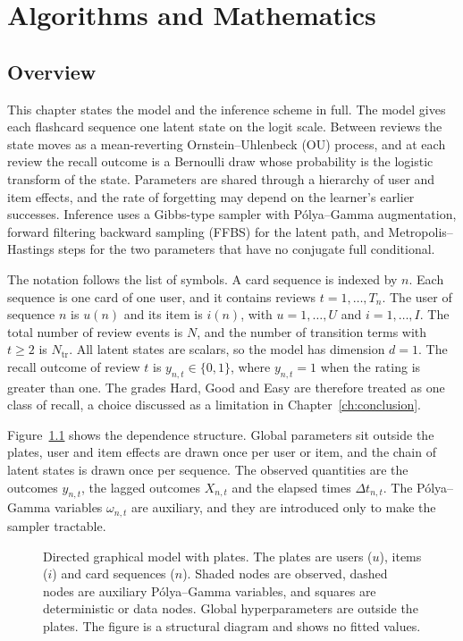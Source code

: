 \chapter{Algorithms and Mathematics}
\label{ch:methodology}

\section{Overview}
\label{sec:method-overview}

This chapter states the model and the inference scheme in full. The model gives each flashcard
sequence one latent state on the logit scale. Between reviews the state moves as a mean-reverting
Ornstein--Uhlenbeck (OU) process, and at each review the recall outcome is a Bernoulli draw whose
probability is the logistic transform of the state. Parameters are shared through a hierarchy of
user and item effects, and the rate of forgetting may depend on the learner's earlier successes.
Inference uses a Gibbs-type sampler with P\'olya--Gamma augmentation, forward filtering backward
sampling (FFBS) for the latent path, and Metropolis--Hastings steps for the two parameters that
have no conjugate full conditional.

The notation follows the list of symbols. A card sequence is indexed by $n$. Each sequence is one
card of one user, and it contains reviews $t = 1, \dots, T_n$. The user of sequence $n$ is $u(n)$
and its item is $i(n)$, with $u = 1, \dots, U$ and $i = 1, \dots, I$. The total number of review events is $N$, and the number of transition terms with $t \ge 2$ is $N_{\mathrm{tr}}$. All latent states are scalars, so the model has dimension
$d = 1$. The recall outcome of review $t$ is $y_{n,t} \in \{0, 1\}$, where $y_{n,t} = 1$ when the
rating is greater than one. The grades Hard, Good and Easy are therefore treated as one class of
recall, a choice discussed as a limitation in Chapter~\ref{ch:conclusion}.

Figure~\ref{fig:tk_graphical_model} shows the dependence structure. Global parameters sit outside
the plates, user and item effects are drawn once per user or item, and the chain of latent states
is drawn once per sequence. The observed quantities are the outcomes $y_{n,t}$, the lagged outcomes
$X_{n,t}$ and the elapsed times $\Delta t_{n,t}$. The P\'olya--Gamma variables $\omega_{n,t}$ are
auxiliary, and they are introduced only to make the sampler tractable.

\begin{figure}[htbp]
  \centering
  
  \caption{Directed graphical model with plates. The plates are users ($u$), items ($i$) and card
    sequences ($n$). Shaded nodes are observed, dashed nodes are auxiliary P\'olya--Gamma variables,
    and squares are deterministic or data nodes. Global hyperparameters are outside the plates. The figure is a
    structural diagram and shows no fitted values.}
  \label{fig:tk_graphical_model}
\end{figure}

